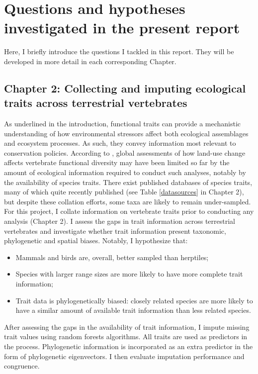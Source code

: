 \section{Questions and hypotheses investigated in the present report}
Here, I briefly introduce the questions I tackled in this report. They will be developed in more detail in each corresponding Chapter.

\subsection{Chapter 2: Collecting and imputing ecological traits across terrestrial vertebrates}

As underlined in the introduction, functional traits can provide a mechanistic understanding of how environmental stressors affect both ecological assemblages and ecosystem processes. As such, they convey information most relevant to conservation policies. According to \citet{Hekkala2018}, global assessments of how land-use change affects vertebrate functional diversity may have been limited so far by the amount of ecological information required to conduct such analyses, notably by the availability of species traits. There exist published databases of species traits, many of which quite recently published (see Table \ref{datasources} in Chapter 2), but despite these collation efforts, some taxa are likely to remain under-sampled. For this project, I collate information on vertebrate traits prior to conducting any analysis (Chapter 2). I assess the gaps in trait information across terrestrial vertebrates and investigate whether trait information present taxonomic, phylogenetic and spatial biases. Notably, I hypothesize that:
 \begin{itemize}
\item Mammals and birds are, overall, better sampled than herptiles;
\item Species with larger range sizes are more likely to have more complete trait information;
\item Trait data is phylogenetically biased: closely related species are more likely to have a similar amount of available trait information than less related species.
\end{itemize}

After assessing the gaps in the availability of trait information, I impute missing trait values using random forests algorithms. All traits are used as predictors in the process. Phylogenetic information is incorporated as an extra predictor in the form of phylogenetic eigenvectors. I then evaluate imputation performance and congruence. 

